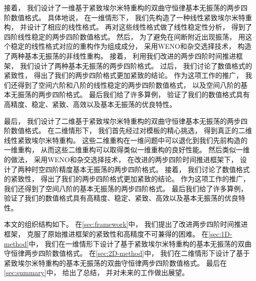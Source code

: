 接着，
我们设计了一维基于紧致埃尔米特重构的双曲守恒律基本无振荡的两步四阶数值格式。
具体地说，
在一维情形下，
我们先构造了一种线性紧致埃尔米特重构，
并设计了相应的线性格式。
再对这些线性格式做了线性稳定性分析，
得到了四阶线性稳定的两步四阶数值格式。
然后，
为了避免在间断附近出现振荡，
用这个稳定的线性格式对应的重构作为组成成分，
采用WENO和杂交选择技术，
构造了两种基本无振荡的非线性重构。
接着，
利用我们改进的两步四阶时间推进框架，
我们设计了两种基本无振荡的两步四阶格式。
过后，
我们讨论了数值格式的紧致性，
得出了我们的两步四阶格式更加紧致的结论。
作为这项工作的推广，
我们还得到了空间六阶和八阶的线性稳定的两步四阶数值格式，
以及空间八阶的基本无振荡的两步四阶格式。
最后我们给了许多算例，
验证了我们的数值格式具有高精度、稳定、紧致、高效以及基本无振荡的优良特性。

最后，
我们设计了二维基于紧致埃尔米特重构的双曲守恒律基本无振荡的两步四阶数值格式。
在二维情形下，
我们首先经过对模板的精心挑选，
得到真正的二维线性紧致埃尔米特重构。
这些二维重构在一维问题中可以退化到我们先前构造的一维重构，
从而这些二维重构可以取得类似一维重构的良好性能。
然后类似一维的做法，
采用WENO和杂交选择技术，
在改进的两步四阶时间推进框架下，
设计了两种时空四阶精度基本无振荡的两步四阶格式。
接着，
我们讨论了数值格式的紧致性，
得出了我们的两步四阶格式更加紧致的结论。
作为这项工作的推广，
我们还得到了空间八阶的基本无振荡的两步四阶格式。
最后我们给了许多算例，
验证了我们的数值格式具有高精度、稳定、紧致、高效以及基本无振荡的优良特性。

\vspace{\baselineskip}
本文的组织结构如下。
在\cref{sec:framework}中，
我们提出了改进两步四阶时间推进框架，
克服了原始推进框架的紧致性和高精度不可兼得的困难。
在\cref{sec:1D-method}中，
我们在一维情形下设计了基于紧致埃尔米特重构的基本无振荡的双曲守恒律两步四阶数值格式。
在\cref{sec:2D-method}中，
我们在二维情形下设计了基于紧致埃尔米特重构的基本无振荡的双曲守恒律两步四阶数值格式。
最后在\cref{sec:summary}中，
给出了总结，
并对未来的工作做出展望。